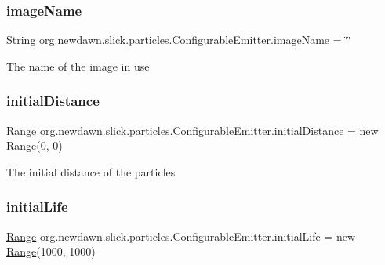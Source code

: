 \subsubsection{\texorpdfstring{image\+Name}{imageName}}
{\footnotesize\ttfamily String org.\+newdawn.\+slick.\+particles.\+Configurable\+Emitter.\+image\+Name = \char`\"{}\char`\"{}}

The name of the image in use \mbox{\label{classorg_1_1newdawn_1_1slick_1_1particles_1_1_configurable_emitter_a8afe8f189acb7cf6b098bef88e601d9d}} 
\subsubsection{\texorpdfstring{initial\+Distance}{initialDistance}}
{\footnotesize\ttfamily \mbox{\hyperlink{classorg_1_1newdawn_1_1slick_1_1particles_1_1_configurable_emitter_1_1_range}{Range}} org.\+newdawn.\+slick.\+particles.\+Configurable\+Emitter.\+initial\+Distance = new \mbox{\hyperlink{classorg_1_1newdawn_1_1slick_1_1particles_1_1_configurable_emitter_1_1_range}{Range}}(0, 0)}

The initial distance of the particles \mbox{\label{classorg_1_1newdawn_1_1slick_1_1particles_1_1_configurable_emitter_a3a6034891395a4a0b7d0eb2e4836e053}} 
\subsubsection{\texorpdfstring{initial\+Life}{initialLife}}
{\footnotesize\ttfamily \mbox{\hyperlink{classorg_1_1newdawn_1_1slick_1_1particles_1_1_configurable_emitter_1_1_range}{Range}} org.\+newdawn.\+slick.\+particles.\+Configurable\+Emitter.\+initial\+Life = new \mbox{\hyperlink{classorg_1_1newdawn_1_1slick_1_1particles_1_1_configurable_emitter_1_1_range}{Range}}(1000, 1000)}

